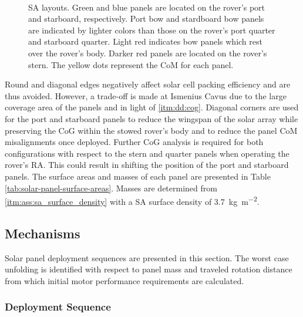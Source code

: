 \begin{figure}[h]
\begin{subfigure}[t]{\subfigureWidth}
		\label{fig:sub:solar-array-layouts-for-ismenius-cavus}
	\end{subfigure}\\[0.8ex]
    \caption[Solar array layouts]
            {\ac{SA} layouts. Green and blue panels are located on the rover's port and starboard, respectively. Port bow and stardboard bow panels are indicated by lighter colors than those on the rover's port quarter and starboard quarter. Light red indicates bow panels which rest over the rover's body. Darker red panels are located on the rover's stern. The yellow dots represent the \ac{CoM} for each panel.}
    \label{fig:solar-array-layouts-for-missions-sites}
\vspace{-2ex}
\end{figure}

\vspace{0.5cm}

Round and diagonal edges negatively affect solar cell packing efficiency and are thus avoided. However, a trade-off is made at Ismenius Cavus due to the large coverage area of the panels and in light of \ref{itm:dd:cog}. Diagonal corners are used for the port and starboard panels to reduce the wingspan of the solar array while preserving the \ac{CoG} within the stowed rover's body and to reduce the panel \ac{CoM} misalignments once deployed. Further \ac{CoG} analysis is required for both configurations with respect to the stern and quarter panels when operating the rover's \ac{RA}. This could result in shifting the position of the port and starboard panels. The surface areas and masses of each panel are presented in Table \ref{tab:solar-panel-surface-areas}. Masses are determined from \ref{itm:ass:sa_surface_density} with a \ac{SA} surface density of \SI{3.7}{kg.m^{-2}}.

\vspace{0.4cm}




\clearpage
\subsection{Mechanisms}
Solar panel deployment sequences are presented in this section. The worst case unfolding is identified with respect to panel mass and traveled rotation distance from which initial motor performance requirements are calculated.

\subsubsection{Deployment Sequence}

